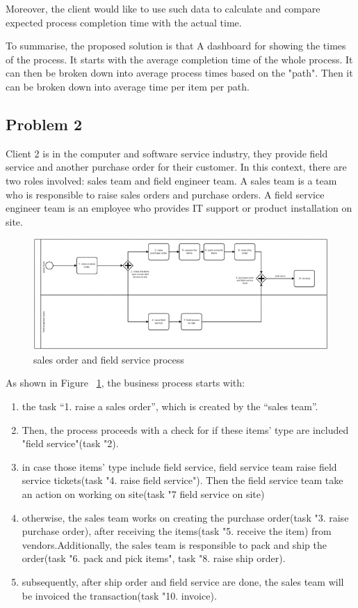 Moreover, the client would like to use such data to calculate and compare expected process completion time with the actual time. 

To summarise, the proposed solution is that A dashboard for showing the times of the process. It starts with the average completion time of the whole process. It can then be broken down into average process times based on the "path". Then it can be broken down into average time per item per path.

\subsection{Problem 2}

Client 2 is in the computer and software service industry, they provide field service and another purchase order for their customer. In this context, there are two roles involved: sales team and field engineer team. A sales team is a team who is responsible to raise sales orders and purchase orders. A field service engineer team is an employee who provides IT support or product installation on site. 

\begin{figure}[!htb]
    \centering 
    \includegraphics[scale=0.7]{resource/soAndFieldService.png}
    \caption{sales order and field service process}
    \label{figure:soAndfieldservice}
\end{figure}

As shown in Figure ~\ref{figure:soAndfieldservice}, the business process starts with:
\begin{enumerate}
    \item the task “1. raise a sales order”, which is created by the “sales team”. 
    \item Then, the process proceeds with a check for if these items' type are included "field service"(task "2). 
    \item in case those items' type include field service, field service team raise field service tickets(task "4. raise field service"). Then the field service team take an action on working on site(task "7 field service on site)
    \item otherwise, the sales team works on creating the purchase order(task "3. raise purchase order), after receiving the items(task "5. receive the item) from vendors.Additionally, the sales team is responsible to pack and ship the order(task "6. pack and pick items", task "8. raise ship order).
    \item subsequently, after ship order and field service are done, the sales team will be invoiced the transaction(task "10. invoice).
\end{enumerate}




